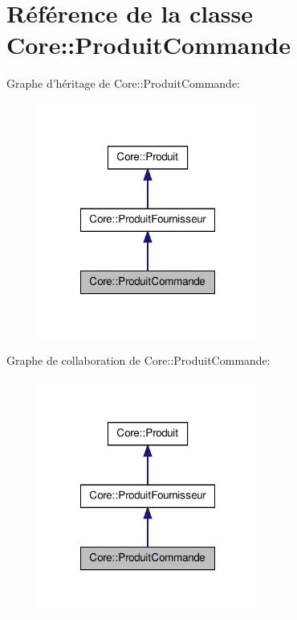 \hypertarget{class_core_1_1_produit_commande}{
\section{Référence de la classe Core::ProduitCommande}
\label{dc/d80/class_core_1_1_produit_commande}
}


Graphe d'héritage de Core::ProduitCommande:\nopagebreak
\begin{figure}[H]
\begin{center}
\leavevmode
\includegraphics[width=204pt]{d3/d36/class_core_1_1_produit_commande__inherit__graph}
\end{center}
\end{figure}


Graphe de collaboration de Core::ProduitCommande:\nopagebreak
\begin{figure}[H]
\begin{center}
\leavevmode
\includegraphics[width=204pt]{d4/d80/class_core_1_1_produit_commande__coll__graph}
\end{center}
\end{figure}
